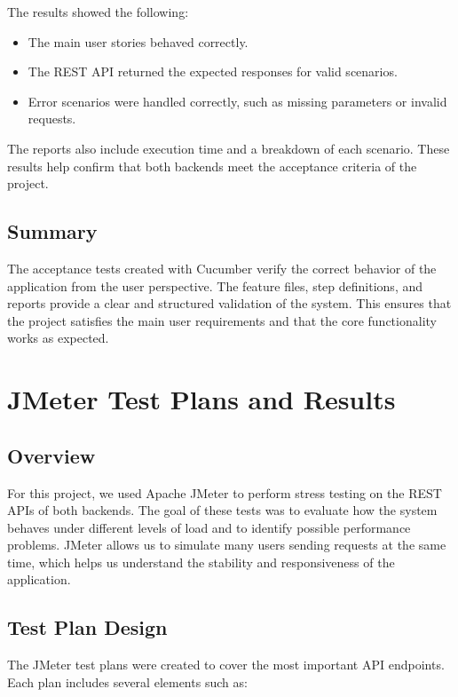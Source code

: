 \documentclass[12pt,a4paper]{article}
\begin{document}
The results showed the following:

\begin{itemize}
	\item The main user stories behaved correctly.
	\item The REST API returned the expected responses for valid scenarios.
	\item Error scenarios were handled correctly, such as missing parameters or invalid requests.
\end{itemize}

The reports also include execution time and a breakdown of each scenario. These results help confirm that both backends meet the acceptance criteria of the project.

\subsection{Summary}

The acceptance tests created with Cucumber verify the correct behavior of the application from the user perspective. The feature files, step definitions, and reports provide a clear and structured validation of the system. This ensures that the project satisfies the main user requirements and that the core functionality works as expected.



\section{JMeter Test Plans and Results}

\subsection{Overview}

For this project, we used Apache JMeter to perform stress testing on the REST APIs of both backends. The goal of these tests was to evaluate how the system behaves under different levels of load and to identify possible performance problems. JMeter allows us to simulate many users sending requests at the same time, which helps us understand the stability and responsiveness of the application.

\subsection{Test Plan Design}

The JMeter test plans were created to cover the most important API endpoints. Each plan includes several elements such as:
\end{document}
